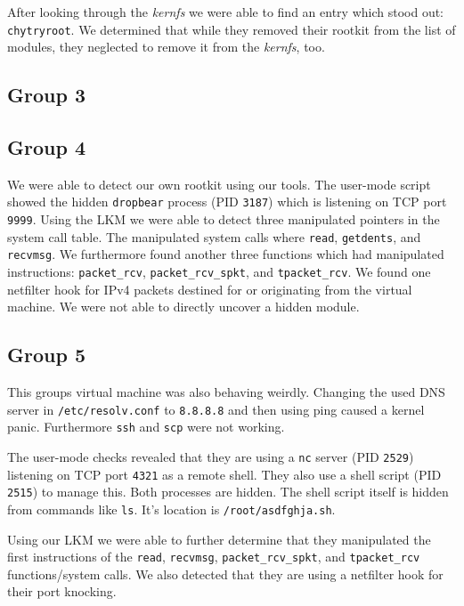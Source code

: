 \documentclass[10pt, letterpaper]{scrartcl}
\begin{document}
After looking through the \emph{kernfs} we were able to find an entry which stood out: \texttt{chytryroot}.
We determined that while they removed their rootkit from the list of modules, they neglected to remove it from the \emph{kernfs}, too.

\subsection{Group 3}




\subsection{Group 4}
We were able to detect our own rootkit using our tools.
The user-mode script showed the hidden \texttt{dropbear} process (PID \texttt{3187}) which is listening on TCP port \texttt{9999}.
Using the LKM we were able to detect three manipulated pointers in the system call table. The manipulated system calls where \texttt{read}, \texttt{getdents}, and \texttt{recvmsg}. We furthermore found another three functions which had manipulated instructions: \texttt{packet\_rcv}, \texttt{packet\_rcv\_spkt}, and \texttt{tpacket\_rcv}.
We found one netfilter hook for IPv4 packets destined for or originating from the virtual machine.
We were not able to directly uncover a hidden module.

\subsection{Group 5}
This groups virtual machine was also behaving weirdly.
Changing the used DNS server in \texttt{/etc/resolv.conf} to \texttt{8.8.8.8} and then using ping caused a kernel panic.
Furthermore \texttt{ssh} and \texttt{scp} were not working.

The user-mode checks revealed that they are using a \texttt{nc} server (PID \texttt{2529}) listening on TCP port \texttt{4321} as a remote shell.
They also use a shell script (PID \texttt{2515}) to manage this.
Both processes are hidden.
The shell script itself is hidden from commands like \texttt{ls}. It's location is \texttt{/root/asdfghja.sh}.

Using our LKM we were able to further determine that they manipulated the first instructions of the \texttt{read}, \texttt{recvmsg}, \texttt{packet\_rcv\_spkt}, and \texttt{tpacket\_rcv} functions/system calls. We also detected that they are using a netfilter hook for their port knocking.
\end{document}
